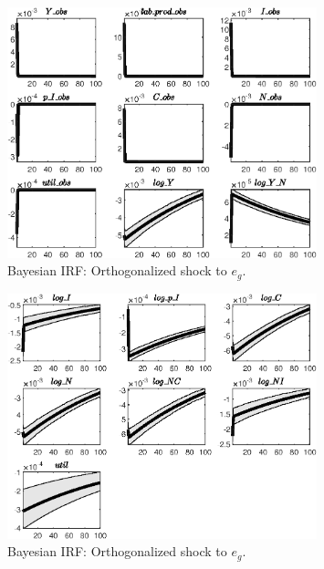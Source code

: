  
\begin{figure}[H]
\centering 
\includegraphics[width=0.80\textwidth]{BRS_imp_mobility_alt/Output/BRS_imp_mobility_alt_Bayesian_IRF_e_g_1}
\caption{Bayesian IRF: Orthogonalized shock to ${e_g}$.}
\label{Fig:BayesianIRF:e_g:1}
\end{figure}
 
\begin{figure}[H]
\centering 
\includegraphics[width=0.80\textwidth]{BRS_imp_mobility_alt/Output/BRS_imp_mobility_alt_Bayesian_IRF_e_g_2}
\caption{Bayesian IRF: Orthogonalized shock to ${e_g}$.}
\label{Fig:BayesianIRF:e_g:2}
\end{figure}
 
